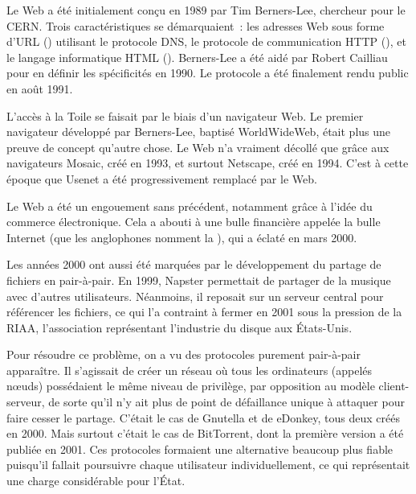 Le Web a été initialement conçu en 1989 par Tim Berners-Lee, chercheur pour le CERN. Trois caractéristiques se démarquaient~: les adresses Web sous forme d'URL () utilisant le protocole DNS, le protocole de communication HTTP (), et le langage informatique HTML (). Berners-Lee a été aidé par Robert Cailliau pour en définir les spécificités en 1990. Le protocole a été finalement rendu public en août 1991.

L'accès à la Toile se faisait par le biais d'un navigateur Web. Le premier navigateur développé par Berners-Lee, baptisé WorldWideWeb, était plus une preuve de concept qu'autre chose. Le Web n'a vraiment décollé que grâce aux navigateurs Mosaic, créé en 1993, et surtout Netscape, créé en 1994. C'est à cette époque que Usenet a été progressivement remplacé par le Web.

Le Web a été un engouement sans précédent, notamment grâce à l'idée du commerce électronique. Cela a abouti à une bulle financière appelée la bulle Internet (que les anglophones nomment la ), qui a éclaté en mars 2000. %

Les années 2000 ont aussi été marquées par le développement du partage de fichiers en pair-à-pair. En 1999, Napster permettait de partager de la musique avec d'autres utilisateurs. Néanmoins, il reposait sur un serveur central pour référencer les fichiers, ce qui l'a contraint à fermer en 2001 sous la pression de la RIAA, l'association représentant l'industrie du disque aux États-Unis.

Pour résoudre ce problème, on a vu des protocoles purement pair-à-pair apparaître. Il s'agissait de créer un réseau où tous les ordinateurs (appelés nœuds) possédaient le même niveau de privilège, par opposition au modèle client-serveur, de sorte qu'il n'y ait plus de point de défaillance unique à attaquer pour faire cesser le partage. C'était le cas de Gnutella et de eDonkey, tous deux créés en 2000. Mais surtout c'était le cas de BitTorrent, dont la première version a été publiée en 2001. Ces protocoles formaient une alternative beaucoup plus fiable puisqu'il fallait poursuivre chaque utilisateur individuellement, ce qui représentait une charge considérable pour l'État.

